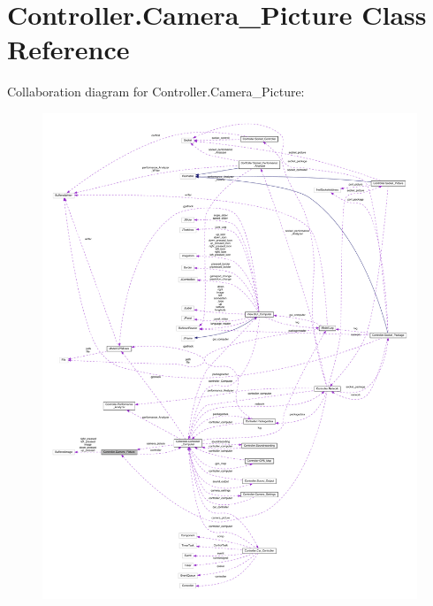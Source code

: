 \hypertarget{class_controller_1_1_camera___picture}{}\section{Controller.\+Camera\+\_\+\+Picture Class Reference}
\label{class_controller_1_1_camera___picture}


Collaboration diagram for Controller.\+Camera\+\_\+\+Picture\+:
\nopagebreak
\begin{figure}[H]
\begin{center}
\leavevmode
\includegraphics[width=350pt]{class_controller_1_1_camera___picture__coll__graph}
\end{center}
\end{figure}
